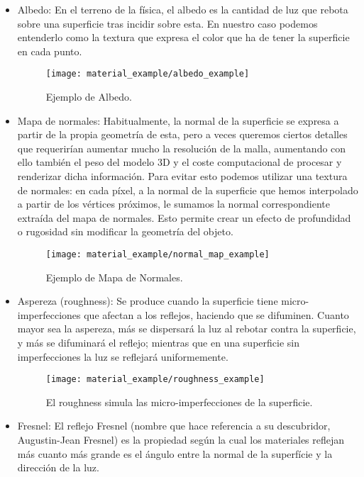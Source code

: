 \begin{itemize}
    \item Albedo: En el terreno de la física, el albedo es la cantidad de luz que rebota sobre una superficie tras incidir sobre esta\cite{def_albedo}. En nuestro caso podemos entenderlo como la textura que expresa el color que ha de tener la superficie en cada punto.
    \begin{figure}[H]
        \centering
        \texttt{[image: material\_example/albedo\_example]}
        \caption{Ejemplo de Albedo\cite{free_pbr}.}
        \label{fig:albedo_ex}
    \end{figure}
    \item Mapa de normales: Habitualmente, la normal de la superficie se expresa a partir de la propia geometría de esta, pero a veces queremos ciertos detalles que requerirían aumentar mucho la resolución de la malla, aumentando con ello también el peso del modelo 3D y el coste computacional de procesar y renderizar dicha información. Para evitar esto podemos utilizar una textura de normales: en cada píxel, a la normal de la superficie que hemos interpolado a partir de los vértices próximos, le sumamos la normal correspondiente extraída del mapa de normales. Esto permite crear un efecto de profundidad o rugosidad sin modificar la geometría del objeto.
    \begin{figure}[H]
        \centering
        \texttt{[image: material\_example/normal\_map\_example]}
        \caption{Ejemplo de Mapa de Normales\cite{free_pbr}.}
        \label{fig:normal_map_ex}
    \end{figure}
    \item Aspereza (roughness): Se produce cuando la superficie tiene micro-imperfecciones que afectan a los reflejos, haciendo que se difuminen. Cuanto mayor sea la aspereza, más se dispersará la luz al rebotar contra la superficie, y más se difuminará el reflejo; mientras que en una superficie sin imperfecciones la luz se reflejará uniformemente.
    \begin{figure}[H]
        \centering
        \texttt{[image: material\_example/roughness\_example]}
        \caption{El roughness simula las micro-imperfecciones de la superficie.}
        \label{fig:roughness_ex}
    \end{figure}
    \item Fresnel: El reflejo Fresnel (nombre que hace referencia a su descubridor, Augustin-Jean Fresnel) es la propiedad según la cual los materiales reflejan más cuanto más grande es el ángulo entre la normal de la superfície y la dirección de la luz.

\end{itemize}
